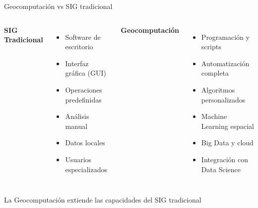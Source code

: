 \documentclass[10pt]{beamer}
\begin{document}
\begin{frame}{Geocomputación vs SIG tradicional}
    \begin{columns}
        \textbf{SIG Tradicional}
        \begin{itemize}
            \item Software de escritorio
            \item Interfaz gráfica (GUI)
            \item Operaciones predefinidas
            \item Análisis manual
            \item Datos locales
            \item Usuarios especializados
        \end{itemize}
        
        \textbf{Geocomputación}
        \begin{itemize}
            \item Programación y scripts
            \item Automatización completa
            \item Algoritmos personalizados
            \item Machine Learning espacial
            \item Big Data y cloud
            \item Integración con Data Science
        \end{itemize}
    \end{columns}
    
    \vspace{0.5cm}
    \begin{center}
        \textcolor{usachblue}{ La Geocomputación extiende las capacidades del SIG tradicional}
    \end{center}
\end{frame}
\end{document}
